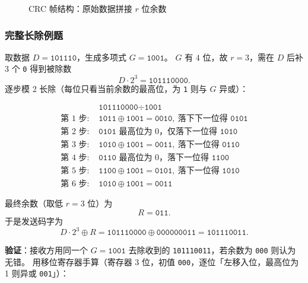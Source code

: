 \begin{figure}[H]
\centering
{}
\caption{CRC 帧结构：原始数据拼接 $r$ 位余数}
\label{fig:crc_frame}
\end{figure}

\subsubsection{完整长除例题}

取数据 $D=\texttt{101110}$，生成多项式 $G=\texttt{1001}$。
$G$ 有 $4$ 位，故 $r=3$，需在 $D$ 后补 $3$ 个 \texttt{0} 得到被除数
\[
D\cdot 2^{3} = \texttt{101110000}.
\]
逐步模 2 长除（每位只看当前余数的最高位，为 \texttt{1} 则与 $G$ 异或）：

\begin{align*}
&\texttt{101110000} \div \texttt{1001}\\[2pt]
\text{第 1 步: } & \texttt{1011} \oplus \texttt{1001} = \texttt{0010},\ \text{落下下一位得 }\texttt{0101}\\
\text{第 2 步: } & \texttt{0101} \text{ 最高位为 0，仅落下一位得 }\texttt{1010}\\
\text{第 3 步: } & \texttt{1010} \oplus \texttt{1001} = \texttt{0011},\ \text{落下一位得 }\texttt{0110}\\
\text{第 4 步: } & \texttt{0110} \text{ 最高位为 0，落下一位得 }\texttt{1100}\\
\text{第 5 步: } & \texttt{1100} \oplus \texttt{1001} = \texttt{0101},\ \text{落下一位得 }\texttt{1010}\\
\text{第 6 步: } & \texttt{1010} \oplus \texttt{1001} = \texttt{0011}
\end{align*}

最终余数（取低 $r=3$ 位）为
\[
R = \texttt{011}.
\]
于是发送码字为
\[
D\cdot 2^{3} \oplus R = \texttt{101110000} \oplus \texttt{000000011} = \texttt{101110011}.
\]

\noindent\textbf{验证}：接收方用同一个 $G=\texttt{1001}$ 去除收到的 \texttt{101110011}，若余数为 \texttt{000} 则认为无错。
用移位寄存器手算（寄存器 3 位，初值 \texttt{000}，逐位「左移入位，最高位为 1 则异或 \texttt{001}」）：

